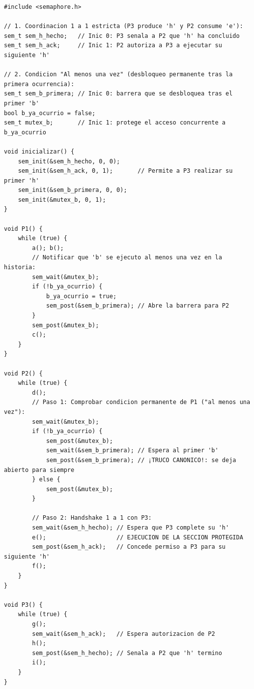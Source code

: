 \documentclass[11pt,a4paper]{article}
\begin{document}
\begin{lstlisting}
#include <semaphore.h>

// 1. Coordinacion 1 a 1 estricta (P3 produce 'h' y P2 consume 'e'):
sem_t sem_h_hecho;   // Inic 0: P3 senala a P2 que 'h' ha concluido
sem_t sem_h_ack;     // Inic 1: P2 autoriza a P3 a ejecutar su siguiente 'h'

// 2. Condicion "Al menos una vez" (desbloqueo permanente tras la primera ocurrencia):
sem_t sem_b_primera; // Inic 0: barrera que se desbloquea tras el primer 'b'
bool b_ya_ocurrio = false;
sem_t mutex_b;       // Inic 1: protege el acceso concurrente a b_ya_ocurrio

void inicializar() {
    sem_init(&sem_h_hecho, 0, 0);
    sem_init(&sem_h_ack, 0, 1);       // Permite a P3 realizar su primer 'h'
    sem_init(&sem_b_primera, 0, 0);
    sem_init(&mutex_b, 0, 1);
}

void P1() {
    while (true) {
        a(); b();
        // Notificar que 'b' se ejecuto al menos una vez en la historia:
        sem_wait(&mutex_b);
        if (!b_ya_ocurrio) {
            b_ya_ocurrio = true;
            sem_post(&sem_b_primera); // Abre la barrera para P2
        }
        sem_post(&mutex_b);
        c();
    }
}

void P2() {
    while (true) {
        d();
        // Paso 1: Comprobar condicion permanente de P1 ("al menos una vez"):
        sem_wait(&mutex_b);
        if (!b_ya_ocurrio) {
            sem_post(&mutex_b);
            sem_wait(&sem_b_primera); // Espera al primer 'b'
            sem_post(&sem_b_primera); // ¡TRUCO CANONICO!: se deja abierto para siempre
        } else {
            sem_post(&mutex_b);
        }

        // Paso 2: Handshake 1 a 1 con P3:
        sem_wait(&sem_h_hecho); // Espera que P3 complete su 'h'
        e();                    // EJECUCION DE LA SECCION PROTEGIDA
        sem_post(&sem_h_ack);   // Concede permiso a P3 para su siguiente 'h'
        f();
    }
}

void P3() {
    while (true) {
        g();
        sem_wait(&sem_h_ack);   // Espera autorizacion de P2
        h();
        sem_post(&sem_h_hecho); // Senala a P2 que 'h' termino
        i();
    }
}
\end{lstlisting}

\vspace{-0.15cm}
\end{document}
